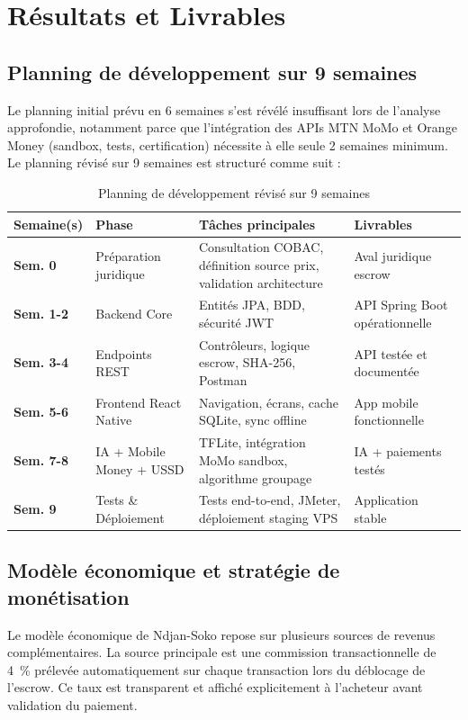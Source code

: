 \documentclass[12pt,a4paper]{report}
\begin{document}
\section{Résultats et Livrables}

\subsection{Planning de développement sur 9 semaines}

Le planning initial prévu en 6 semaines s'est révélé insuffisant lors de l'analyse approfondie, notamment parce que l'intégration des APIs MTN MoMo et Orange Money (sandbox, tests, certification) nécessite à elle seule 2 semaines minimum. Le planning révisé sur 9 semaines est structuré comme suit :

\begin{table}[H]
\centering
\caption{Planning de développement révisé sur 9 semaines}
\begin{tabularx}{\textwidth}{C{2.2cm} L{3cm} L{5cm} L{3.5cm}}
\toprule
\textbf{Semaine(s)} & \textbf{Phase} & \textbf{Tâches principales} & \textbf{Livrables} \\
\midrule
\textbf{Sem. 0} & Préparation juridique & Consultation COBAC, définition source prix, validation architecture & Aval juridique escrow \\
\textbf{Sem. 1-2} & Backend Core & Entités JPA, BDD, sécurité JWT & API Spring Boot opérationnelle \\
\textbf{Sem. 3-4} & Endpoints REST & Contrôleurs, logique escrow, SHA-256, Postman & API testée et documentée \\
\textbf{Sem. 5-6} & Frontend React Native & Navigation, écrans, cache SQLite, sync offline & App mobile fonctionnelle \\
\textbf{Sem. 7-8} & IA + Mobile Money + USSD & TFLite, intégration MoMo sandbox, algorithme groupage & IA + paiements testés \\
\textbf{Sem. 9} & Tests \& Déploiement & Tests end-to-end, JMeter, déploiement staging VPS & Application stable \\
\bottomrule
\end{tabularx}
\end{table}

\subsection{Modèle économique et stratégie de monétisation}

Le modèle économique de Ndjan-Soko repose sur plusieurs sources de revenus complémentaires. La source principale est une commission transactionnelle de 4~\% prélevée automatiquement sur chaque transaction lors du déblocage de l'escrow. Ce taux est transparent et affiché explicitement à l'acheteur avant validation du paiement.
\end{document}
